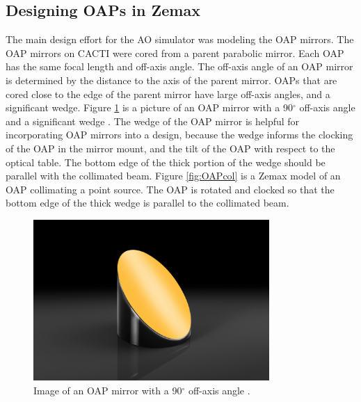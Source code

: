 
\subsection{Designing OAPs in Zemax}
The main design effort for the AO simulator was modeling the OAP mirrors. The OAP mirrors on CACTI were cored from a parent parabolic mirror. Each OAP has the same focal length and off-axis angle. The off-axis angle of an OAP mirror is determined by the distance to the axis of the parent mirror. OAPs that are cored close to the edge of the parent mirror have large off-axis angles, and a significant wedge. Figure \ref{fig:OAPedmund} is a picture of an OAP mirror with a 90$^{\circ}$ off-axis angle and a significant wedge \citep{edmundoptic}. The wedge of the OAP mirror is helpful for incorporating OAP mirrors into a design, because the wedge informs the clocking of the OAP in the mirror mount, and the tilt of the OAP with respect to the optical table. The bottom edge of the thick portion of the wedge should be parallel with the collimated beam. Figure \ref{fig:OAPcol} is a Zemax model of an OAP collimating a point source. The OAP is rotated and clocked so that the bottom edge of the thick wedge is parallel to the collimated beam. 

\begin{figure}
    \centering
    \includegraphics[width=0.8\textwidth]{Chapter Materials/Chapter Five Materials/OAP.png}
    \caption{Image of an OAP mirror with a 90$^{\circ}$ off-axis angle \citep{edmundoptic}.}
    \label{fig:OAPedmund}
\end{figure}


